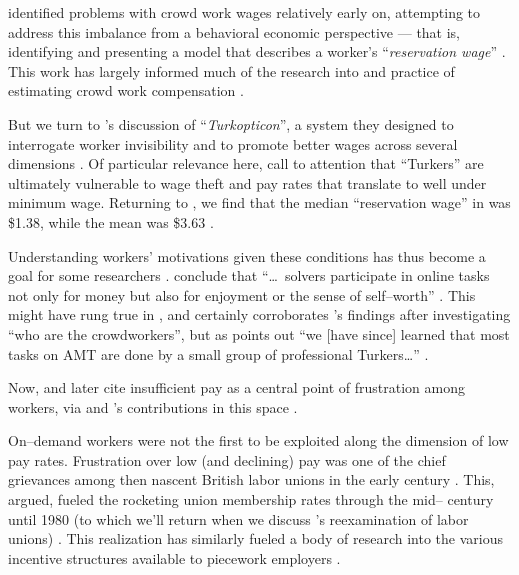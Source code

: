 \documentclass{sigchi}
\begin{document}
\citeauthor{laborEconomicsOfCrowdsourcingHorton}
identified problems with crowd work wages relatively early on,
attempting to address this imbalance from a behavioral economic perspective ---
that is, identifying and presenting a model that describes a worker's
``\textit{reservation wage}''
\cite{laborEconomicsOfCrowdsourcingHorton}.
This work has largely informed much of the research into and practice of estimating crowd work compensation
\cite{incentivesShaw,paolacci2010running}.

But we turn to \citeauthor{turkopticon}'s discussion of ``\textit{Turkopticon}'',
a system they designed to interrogate worker invisibility and to promote better wages across several dimensions
\cite{turkopticon}.
Of particular relevance here,
\citeauthor{turkopticon} call to attention that ``Turkers'' are ultimately vulnerable to
wage theft and
pay rates that translate to well under minimum wage.
Returning to \citeauthor{laborEconomicsOfCrowdsourcingHorton},
we find that the median ``reservation wage'' in \citeyear{laborEconomicsOfCrowdsourcingHorton}
was \$1.38, while the mean was \$3.63
\cite{laborEconomicsOfCrowdsourcingHorton}.

Understanding workers' motivations given these conditions has thus become a goal for some researchers
\cite{whyWouldAnyoneBrewer}.
\citeauthor{Sun20111033} conclude that
``\dots~solvers participate in online tasks
not only for money
but also for enjoyment
or the sense of self--worth''
\cite{Sun20111033}.
This might have rung true in \citeyear{Sun20111033},
and certainly corroborates \citeauthor{Ross}'s findings after investigating
``who are the crowdworkers'',
but as \citeauthor{whoareNOTtheTurkers} points out
``we [have since] learned that most tasks on AMT are done by a small group of professional Turkers\dots''
\cite{Ross,whoareNOTtheTurkers}.

Now, \citeauthor{turkopticon}
and later
\citeauthor{dynamo} cite insufficient pay as a central point of frustration among workers,
via \citeauthor{irani2015cultural} and \citeauthor{dawnDigitalSweatshopCushing}'s contributions in this space
\cite{dynamo,irani2015cultural,dawnDigitalSweatshopCushing,turkopticon}.

On--demand workers were not the first to be exploited along the dimension of low pay rates.
Frustration over low (and declining) pay was one of the chief grievances among then nascent
British labor unions in the early  century
\cite{turner1952trade}.
This, \citeauthor{ebbinghaus1999institutions} argued,
fueled the rocketing union membership rates through the mid-- century until 1980
(to which we'll return when we discuss \citeauthor{levi2009union}'s reexamination of labor unions)
\cite{ebbinghaus1999institutions,levi2009union}.
This realization has similarly fueled a body of research into
the various incentive structures available to piecework employers
\cite{roy1953work}.
\end{document}
